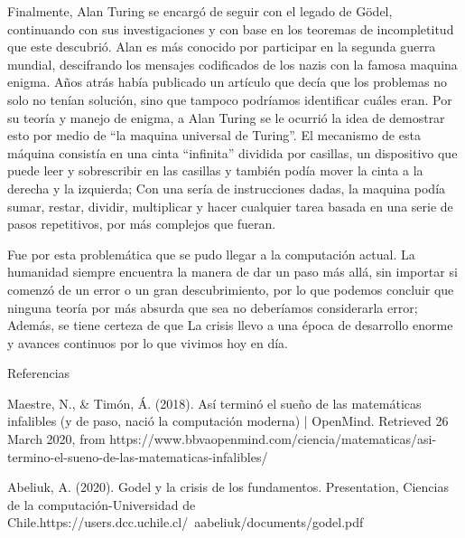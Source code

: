 \documentclass{article}
\begin{document}
Finalmente, Alan Turing se encargó de seguir con el legado de Gödel, continuando con sus investigaciones y con base en los teoremas de incompletitud que este descubrió. Alan es más conocido por participar en la segunda guerra mundial, descifrando los mensajes codificados de los nazis con la famosa maquina enigma. Años atrás había publicado un artículo que decía que los problemas no solo no tenían solución, sino que tampoco podríamos identificar cuáles eran. Por su teoría y manejo de enigma, a Alan Turing se le ocurrió la idea de demostrar esto por medio de “la maquina universal de Turing”. El mecanismo de esta máquina consistía en una cinta “infinita” dividida por casillas, un dispositivo que puede leer y sobrescribir en las casillas y también podía mover la cinta a la derecha y la izquierda; Con una sería de instrucciones dadas, la maquina podía sumar, restar, dividir, multiplicar y hacer cualquier tarea basada en una serie de pasos repetitivos, por más complejos que fueran.

Fue por esta problemática que se pudo llegar a la computación actual. La humanidad siempre encuentra la manera de dar un paso más allá, sin importar si comenzó de un error o un gran descubrimiento, por lo que podemos concluir que ninguna teoría por más absurda que sea no deberíamos considerarla error; Además, se tiene certeza de que La crisis llevo a una época de desarrollo enorme y avances continuos por lo que vivimos hoy en día.

\vspace{5mm}
Referencias\newline

 Maestre, N., & Timón, Á. (2018). Así terminó el sueño de las matemáticas infalibles (y de paso, nació la computación moderna) | OpenMind. Retrieved 26 March 2020, from https://www.bbvaopenmind.com/ciencia/matematicas/asi-termino-el-sueno-de-las-matematicas-infalibles/\newline
 
 Abeliuk, A. (2020). Godel y la crisis de los fundamentos. Presentation, Ciencias de la computación-Universidad de Chile.https://users.dcc.uchile.cl/~aabeliuk/documents/godel.pdf
 
\end{document}
